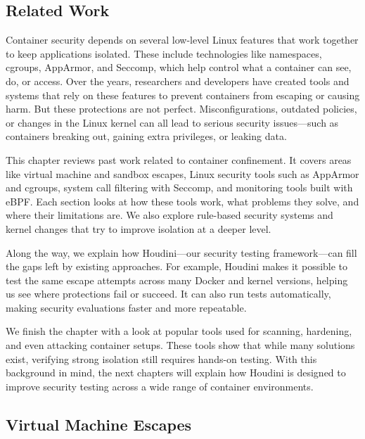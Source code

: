 \documentclass[12pt]{report}
\begin{document}
\begin{doublespace}
\chapter{Related Work}

Container security depends on several low-level Linux features that work together to keep applications isolated. These include technologies like namespaces, cgroups, AppArmor, and Seccomp, which help control what a container can see, do, or access. Over the years, researchers and developers have created tools and systems that rely on these features to prevent containers from escaping or causing harm. But these protections are not perfect. Misconfigurations, outdated policies, or changes in the Linux kernel can all lead to serious security issues—such as containers breaking out, gaining extra privileges, or leaking data.

This chapter reviews past work related to container confinement. It covers areas like virtual machine and sandbox escapes, Linux security tools such as AppArmor and cgroups, system call filtering with Seccomp, and monitoring tools built with eBPF. Each section looks at how these tools work, what problems they solve, and where their limitations are. We also explore rule-based security systems and kernel changes that try to improve isolation at a deeper level.

Along the way, we explain how Houdini—our security testing framework—can fill the gaps left by existing approaches. For example, Houdini makes it possible to test the same escape attempts across many Docker and kernel versions, helping us see where protections fail or succeed. It can also run tests automatically, making security evaluations faster and more repeatable.

We finish the chapter with a look at popular tools used for scanning, hardening, and even attacking container setups. These tools show that while many solutions exist, verifying strong isolation still requires hands-on testing. With this background in mind, the next chapters will explain how Houdini is designed to improve security testing across a wide range of container environments.

\section{Virtual Machine Escapes} 


\end{doublespace}
\end{document}

